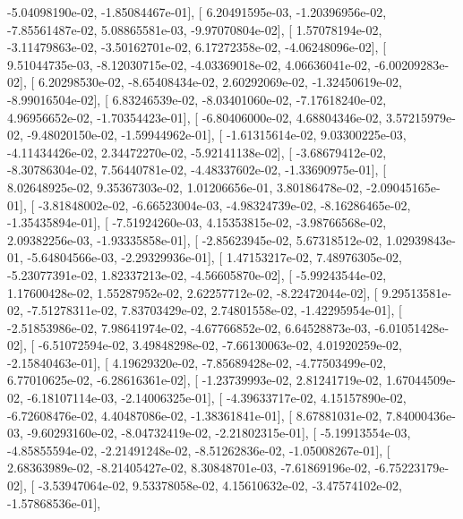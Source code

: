 \documentclass{article}
\begin{document}
         -5.04098190e-02,  -1.85084467e-01],
       [  6.20491595e-03,  -1.20396956e-02,  -7.85561487e-02,
          5.08865581e-03,  -9.97070804e-02],
       [  1.57078194e-02,  -3.11479863e-02,  -3.50162701e-02,
          6.17272358e-02,  -4.06248096e-02],
       [  9.51044735e-03,  -8.12030715e-02,  -4.03369018e-02,
          4.06636041e-02,  -6.00209283e-02],
       [  6.20298530e-02,  -8.65408434e-02,   2.60292069e-02,
         -1.32450619e-02,  -8.99016504e-02],
       [  6.83246539e-02,  -8.03401060e-02,  -7.17618240e-02,
          4.96956652e-02,  -1.70354423e-01],
       [ -6.80406000e-02,   4.68804346e-02,   3.57215979e-02,
         -9.48020150e-02,  -1.59944962e-01],
       [ -1.61315614e-02,   9.03300225e-03,  -4.11434426e-02,
          2.34472270e-02,  -5.92141138e-02],
       [ -3.68679412e-02,  -8.30786304e-02,   7.56440781e-02,
         -4.48337602e-02,  -1.33690975e-01],
       [  8.02648925e-02,   9.35367303e-02,   1.01206656e-01,
          3.80186478e-02,  -2.09045165e-01],
       [ -3.81848002e-02,  -6.66523004e-03,  -4.98324739e-02,
         -8.16286465e-02,  -1.35435894e-01],
       [ -7.51924260e-03,   4.15353815e-02,  -3.98766568e-02,
          2.09382256e-03,  -1.93335858e-01],
       [ -2.85623945e-02,   5.67318512e-02,   1.02939843e-01,
         -5.64804566e-03,  -2.29329936e-01],
       [  1.47153217e-02,   7.48976305e-02,  -5.23077391e-02,
          1.82337213e-02,  -4.56605870e-02],
       [ -5.99243544e-02,   1.17600428e-02,   1.55287952e-02,
          2.62257712e-02,  -8.22472044e-02],
       [  9.29513581e-02,  -7.51278311e-02,   7.83703429e-02,
          2.74801558e-02,  -1.42295954e-01],
       [ -2.51853986e-02,   7.98641974e-02,  -4.67766852e-02,
          6.64528873e-03,  -6.01051428e-02],
       [ -6.51072594e-02,   3.49848298e-02,  -7.66130063e-02,
          4.01920259e-02,  -2.15840463e-01],
       [  4.19629320e-02,  -7.85689428e-02,  -4.77503499e-02,
          6.77010625e-02,  -6.28616361e-02],
       [ -1.23739993e-02,   2.81241719e-02,   1.67044509e-02,
         -6.18107114e-03,  -2.14006325e-01],
       [ -4.39633717e-02,   4.15157890e-02,  -6.72608476e-02,
          4.40487086e-02,  -1.38361841e-01],
       [  8.67881031e-02,   7.84000436e-03,  -9.60293160e-02,
         -8.04732419e-02,  -2.21802315e-01],
       [ -5.19913554e-03,  -4.85855594e-02,  -2.21491248e-02,
         -8.51262836e-02,  -1.05008267e-01],
       [  2.68363989e-02,  -8.21405427e-02,   8.30848701e-03,
         -7.61869196e-02,  -6.75223179e-02],
       [ -3.53947064e-02,   9.53378058e-02,   4.15610632e-02,
         -3.47574102e-02,  -1.57868536e-01],
\end{document}

